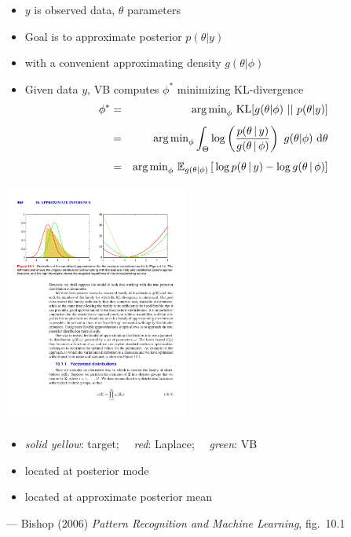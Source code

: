 \documentclass[10pt]{report}
\begin{document}
%
\begin{itemize}
\item $y$ is observed data, $\theta$ parameters
\item Goal is to approximate posterior $p(\theta | y)$
\item with a convenient approximating density $g(\theta | \phi)$
\item Given data $y$, VB computes $\phi^*$ 
minimizing KL-divergence
{\small
\begin{eqnarray*}
\phi^* 
& = & 
\displaystyle
\mbox{arg\,min}_{\phi} \ \mbox{KL}[g(\theta|\phi) \ || \ p(\theta|y)]
\\[4pt]
& = & 
\displaystyle
\mbox{arg\,min}_{\phi}
\int_{\Theta} 
  \log\left(
    \frac{p(\theta \, | \, y)}{g(\theta \, | \, \phi)}
  \right)
  \ g(\theta | \phi) \ \mathrm{d}\theta
\\[4pt]
& = &
\mbox{arg\,min}_{\phi} \
\mathbb{E}_{g(\theta|\phi)}\left[\,
  \log p(\theta \, | \, y) - \log g(\theta \, | \, \phi)
\right]
\end{eqnarray*}
}
\end{itemize}


%
\vspace*{-6pt}
\begin{center}
\includegraphics[width=0.45\textwidth]{img/bishop-fig-10-1.pdf}
\end{center}
\vspace*{-10pt}
\begin{itemize}
\item {\slshape solid yellow}: target; \ \ {\slshape red}: Laplace; \ \
  {\slshape green}: VB
\item \myemph{Laplace} located at posterior mode
\item \myemph{VB} located at approximate posterior mean
\end{itemize}
\vfill \hfill
{\footnotesize  --- Bishop (2006) {\slshape Pattern Recognition and Machine Learning}, fig.~10.1}
\end{document}
